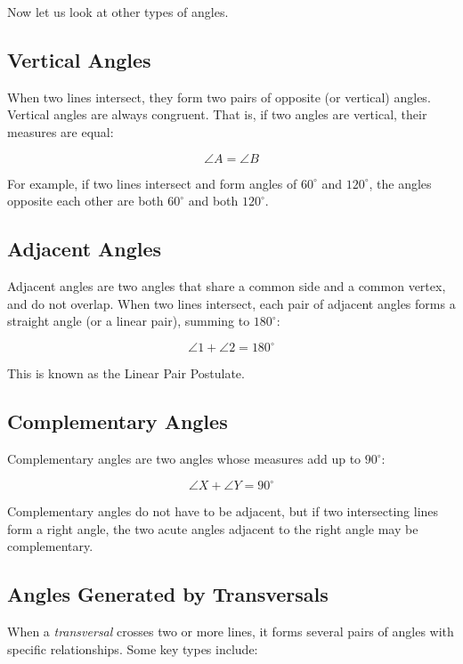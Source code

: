 Now let us look at other types of angles.

\subsection{Vertical Angles}

When two lines intersect, they form two pairs of opposite (or vertical) angles. Vertical angles are 
always congruent. That is, if two angles are vertical, their measures are equal:

\[
	\angle A = \angle B
\]

For example, if two lines intersect and form angles of \( 60^\circ \) and \( 120^\circ \), the angles 
opposite each other are both \( 60^\circ \) and both \( 120^\circ \).

\subsection{Adjacent Angles}

Adjacent angles are two angles that share a common side and a common vertex, and do not overlap. When two 
lines intersect, each pair of adjacent angles forms a straight angle (or a linear pair), summing to 
\(180^\circ\):

\[
	\angle 1 + \angle 2 = 180^\circ
\]

This is known as the Linear Pair Postulate.

\subsection{Complementary Angles}

Complementary angles are two angles whose measures add up to \(90^\circ\):

\[
	\angle X + \angle Y = 90^\circ
\]

Complementary angles do not have to be adjacent, but if two intersecting lines form a right angle, the 
two acute angles adjacent to the right angle may be complementary.

\subsection{Angles Generated by Transversals}

When a \emph{transversal} crosses two or more lines, it forms several pairs of angles with specific 
relationships. Some key types include:

